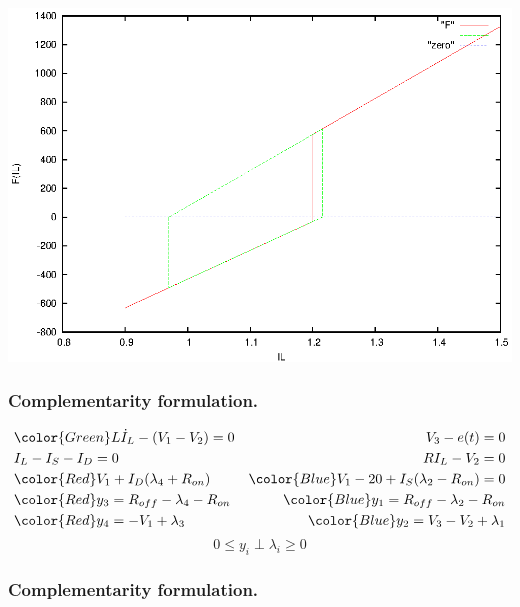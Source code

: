 \frame
{

\includegraphics{F_FNR.eps}

 }
 
 \frame
{
\frametitle{Complementarity formulation.}

\begin{figure}
   \centerline{
   \scalebox{0.8}{
    
    }
 } 
 \end{figure}

  
 \begin{eqnarray*}
 &{\color{Green}L\dot I_L -(V_1-V_2)=0}&V_3-e(t)=0\\
 &I_L-I_S-I_D=0&RI_L-V_2=0\\
 &{\color{Red}V_1+I_D(\lambda _4 +R_{on})}&{\color{Blue}V_1-20+I_S(\lambda _2 - R_{on})=0}\\
 &{\color{Red}y_3=R_{off}-\lambda _4 - R_{on}}&{\color{Blue}y_1=R_{off}-\lambda _2-R_{on}}\\
 &{\color{Red}y_4=-V_1+\lambda _3}&{\color{Blue}y_2=V_3-V_2+\lambda _1}\\
 \end{eqnarray*}
 \[0 \leq y_i \perp \lambda _i \geq 0\]
 }

\frame
{

\frametitle{Complementarity formulation.}
 \begin{figure}
   
 \end{figure}

 }
